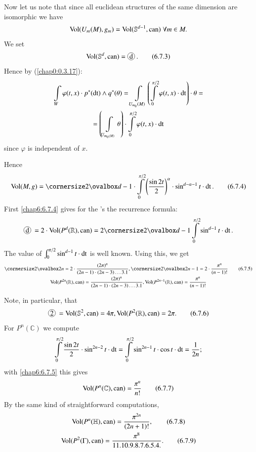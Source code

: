 Now let us note that since all euclidean structures of the same
dimension are isomorphic we have
$$
\operatorname{Vol}(U_{m}(M),g_{m})=\operatorname{Vol}(\mathbb{S}^{d-1},\operatorname{can}) \; \forall m\in M.
$$
We set
\begin{equation*}
\Vol(\mathbb{S}^{d},\can)=\mycirc{d}.\tag{6.7.3}\label{chap6:6.7.3}
\end{equation*}
Hence by (\ref{chap0:0.3.17}):
\begin{gather*}
\int\limits_{W}\varphi(t,x)\cdot p^{\ast}(\operatorname{dt})\wedge
q^{\ast}(\theta)=\int\limits_{U_{m_{0}}(M)}\left(\int\limits^{\pi/2}_{0}\varphi(t,x)\cdot
\operatorname{dt}\right)\cdot \theta=\\
=\left(\int\limits_{U_{m_{0}(M)}}\theta\right)\cdot\int\limits^{\pi/2}_{0}\varphi(t,x)\cdot \operatorname{dt}
\end{gather*}\pageoriginale
since $\varphi$ is independent of $x$.

Hence
\begin{equation*}
\Vol(M,g)=\oval{d-1}\cdot \int\limits^{\pi/2}_{0}\left(\frac{\sin
  2t}{2}\right)^{\alpha}\cdot \sin^{d-\alpha-1}t\cdot
\dt.\tag{6.7.4}\label{chap6:6.7.4} 
\end{equation*}
First \eqref{chap6:6.7.4} gives for the 's the recurrence formula:
$$
\mycirc{d}=2\cdot
\Vol(P^{d}(\mathbb{R}),\can)=2\oval{d-1}\int\limits^{\pi/2}_{0}\sin^{d-1}t\cdot
\dt.
$$
The value of $\int^{\pi/2}_{0}\sin^{d-1}t\cdot \operatorname{dt}$ is well
known. Using this, we get
{\fontsize{9}{11}\selectfont
\begin{gather*}
\oval{2n}=2\cdot\frac{(2\pi)^{n}}{(2n-1)\cdot (2n-3)\ldots
  3.1},\oval{2n-1}=2\cdot
\frac{\pi^{n}}{(n-1)!}\tag{6.7.5}\label{chap6:6.7.5}\\
\Vol(P^{2n}(\mathbb{R}),\can)=\frac{(2\pi)^{n}}{(2n-1)\cdot
  (2n-3)\ldots 3.1},\Vol(P^{2n-1}(\mathbb{R}),\can)=\frac{\pi^{n}}{(n-1)!}
\end{gather*}}\relax

Note, in particular, that
\begin{equation*}
\mycirc{2}=\Vol(\mathbb{S}^{2},\can)=4\pi,\Vol(P^{2}(\mathbb{R}),\can)=2\pi.\tag{6.7.6}\label{chap6:6.7.6} 
\end{equation*}
For $P^{n}(\mathbb{C})$ we compute
$$
\int\limits^{\pi/2}_{0}\frac{\sin 2t}{2}\cdot \sin^{2n-2}t\cdot
\operatorname{dt}=\int\limits^{\pi/2}_{0}\sin^{2n-1}t\cdot\cos t\cdot \operatorname{dt}=\frac{1}{2n};
$$
with \eqref{chap6:6.7.5} this gives
\begin{equation*}
\operatorname{Vol}(P^{n}(\mathbb{C}),\operatorname{can})=\frac{\pi^{n}}{n!}\tag{6.7.7}\label{chap6:6.7.7}
\end{equation*}
By \pageoriginale the same kind of straightforward computations,
\begin{gather*}
\operatorname{Vol}(P^{n}(\mathbb{H}),\operatorname{can})=\frac{\pi^{2n}}{(2n+1)!},\tag{6.7.8}\label{chap6:6.7.8}\\
\operatorname{Vol}(P^{2}(\Gamma),\operatorname{can})=\frac{\pi^{8}}{11.10.9.8.7.6.5.4.}.\tag{6.7.9}\label{chap6:6.7.9} 
\end{gather*}

